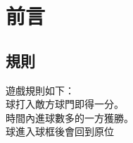 \chapter{前言}
\renewcommand{\baselinestretch}{10.0} %
\setcounter{page}{1}  %
\fontsize{14pt}{2.5pt}\sectionef
\section{規則}

遊戲規則如下：\\
球打入敵方球門即得一分。\\
 時間內進球數多的一方獲勝。\\
球進入球框後會回到原位\\
\renewcommand{\baselinestretch}{0.5} %